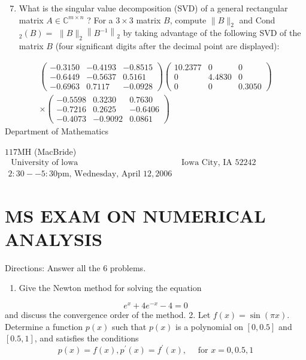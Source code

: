 \documentclass[10pt]{article}
\begin{document}
\begin{enumerate}
  \setcounter{enumi}{6}
  \item What is the singular value decomposition (SVD) of a general rectangular matrix $A \in \mathbb{C}^{m \times n}$ ? For a $3 \times 3$ matrix $B$, compute $\|B\|_{2}$ and Cond $_{2}(B)=$ $\|B\|_{2}\left\|B^{-1}\right\|_{2}$ by taking advantage of the following SVD of the matrix $B$ (four significant digits after the decimal point are displayed):
\end{enumerate}
$$
\begin{gathered}
\left(\begin{array}{rrr}
-0.3150 & -0.4193 & -0.8515 \\
-0.6449 & -0.5637 & 0.5161 \\
-0.6963 & 0.7117 & -0.0928
\end{array}\right)\left(\begin{array}{rrrr}
10.2377 & 0 & 0 \\
0 & 4.4830 & 0 \\
0 & 0 & 0.3050
\end{array}\right) \\
\times\left(\begin{array}{rrr}
-0.5598 & 0.3230 & 0.7630 \\
-0.7216 & 0.2625 & -0.6406 \\
-0.4073 & -0.9092 & 0.0861
\end{array}\right)
\end{gathered}
$$
Department of Mathematics

$117 \mathrm{MH}$ (MacBride) $\begin{array}{lr}\text { University of lowa } & \text { Iowa City, IA } 52242 \\ 2: 30--5: 30 \mathrm{pm} \text {, Wednesday, April } 12,2006\end{array}$

\section{MS EXAM ON NUMERICAL ANALYSIS}
Directions: Answer all the 6 problems.

\begin{enumerate}
  \item Give the Newton method for solving the equation
\end{enumerate}
$$
e^{x}+4 e^{-x}-4=0
$$
and discuss the convergence order of the method. 2. Let $f(x)=\sin (\pi x)$. Determine a function $p(x)$ such that $p(x)$ is a polynomial on $[0,0.5]$ and $[0.5,1]$, and satisfies the conditions
$$
p(x)=f(x), p^{\prime}(x)=f^{\prime}(x), \quad \text { for } x=0,0.5,1
$$
\end{document}

